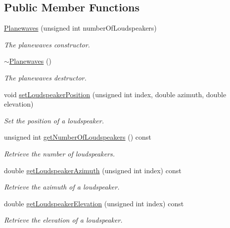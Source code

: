 \subsection*{Public Member Functions}
\begin{DoxyCompactItemize}
\item 
\hyperlink{class_hoa3_d_1_1_planewaves_ad8e35af93d879852edad6b5823b2047d}{Planewaves} (unsigned int number\-Of\-Loudspeakers)
\begin{DoxyCompactList}\small\item\em The planewaves constructor. \end{DoxyCompactList}\item 
\hyperlink{class_hoa3_d_1_1_planewaves_a7d13cc39051ae75f2af522651a1305bf}{$\sim$\-Planewaves} ()
\begin{DoxyCompactList}\small\item\em The planewaves destructor. \end{DoxyCompactList}\item 
void \hyperlink{class_hoa3_d_1_1_planewaves_afb91431ec200af76ac61ef17add33ede}{set\-Loudspeaker\-Position} (unsigned int index, double azimuth, double elevation)
\begin{DoxyCompactList}\small\item\em Set the position of a loudspeaker. \end{DoxyCompactList}\item 
unsigned int \hyperlink{class_hoa3_d_1_1_planewaves_a467cdb1f079bb299225a9fac56a500e4}{get\-Number\-Of\-Loudspeakers} () const 
\begin{DoxyCompactList}\small\item\em Retrieve the number of loudspeakers. \end{DoxyCompactList}\item 
double \hyperlink{class_hoa3_d_1_1_planewaves_a8c0385dcf84e93ea035a91659122ce58}{get\-Loudspeaker\-Azimuth} (unsigned int index) const 
\begin{DoxyCompactList}\small\item\em Retrieve the azimuth of a loudspeaker. \end{DoxyCompactList}\item 
double \hyperlink{class_hoa3_d_1_1_planewaves_ae3b79c947e1923c5aad5067f7a2b29eb}{get\-Loudspeaker\-Elevation} (unsigned int index) const 
\begin{DoxyCompactList}\small\item\em Retrieve the elevation of a loudspeaker. \end{DoxyCompactList}\item 

\end{DoxyCompactItemize}
